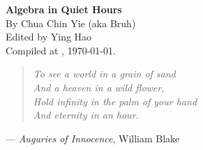 \documentclass[english,10pt,a5paper]{article}
\theoremstyle{definition}
\begin{document}
	\begin{center}
	\Large \textbf{Algebra in Quiet Hours} \smallskip
		\\
	\large	By Chua Chin Yie (aka Bruh) 
	\\[1em] \small Edited by Ying Hao 
	\\ \small Compiled at \currenttime, \today.
	\\[2em]
	\end{center}

	\begin{center}
		\small
		\begin{minipage}{0.7\textwidth}
			\begin{verse}
			\itshape
			To see a world in a grain of sand \\
			And a heaven in a wild flower, \\
			Hold infinity in the palm of your hand \\
			And eternity in an hour.
			\end{verse}

			\hspace{0.26\textwidth} %
			--- \textit{Auguries of Innocence}, William Blake

		\end{minipage}
	\end{center}

    \tableofcontents 
    
    
\clearpage
{}
    
\begingroup
\allowdisplaybreaks
{




















}\endgroup

\clearpage
{}
\printbibliography
\end{document}
